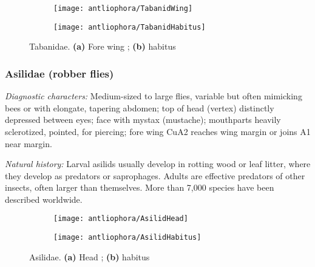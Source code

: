 \begin{figure}[ht!]
    \centering
    \begin{subfigure}[ht!]{0.4\textwidth}
        \texttt{[image: antliophora/TabanidWing]}
        \caption{}
        \label{fig:tabanid1}
    \end{subfigure}
    \qquad
    \begin{subfigure}[ht!]{0.5\textwidth}
        \texttt{[image: antliophora/TabanidHabitus]}
        \caption{}
        \label{fig:tabanid2}
    \end{subfigure}
    \caption{Tabanidae. \textbf{(a)} Fore wing \citep[][Fig. 31.35]{mcalpine1981manual}; \textbf{(b)} habitus \citep[][Fig. 31.1]{mcalpine1981manual}}\label{fig:tabanids}
\end{figure}

\subsubsection{Asilidae (robber flies)}
\noindent{}\textit{Diagnostic characters:} Medium-sized to large flies, variable but often mimicking bees or with elongate, tapering abdomen; top of head (vertex) distinctly depressed between eyes; face with mystax (mustache); mouthparts heavily sclerotized, pointed, for piercing; fore wing CuA2 reaches wing margin or joins A1 near margin.\vspace{3mm}

\noindent{}\textit{Natural history:} Larval asilids usually develop in rotting wood or leaf litter, where they develop as predators or saprophages. Adults are effective predators of other insects, often larger than themselves. More than 7,000 species have been described worldwide.

\begin{figure}[ht!]
    \centering
    \begin{subfigure}[ht!]{0.25\textwidth}
        \texttt{[image: antliophora/AsilidHead]}
        \caption{}
        \label{fig:asilid2}
    \end{subfigure}
    \qquad 
    \begin{subfigure}[ht!]{0.45\textwidth}
        \texttt{[image: antliophora/AsilidHabitus]}
        \caption{}
        \label{fig:asilid1}
    \end{subfigure}
    \caption{Asilidae. \textbf{(a)} Head \citep[][Fig. 42.35]{mcalpine1981manual}; \textbf{(b)} habitus \citep[][Fig. 42.1]{mcalpine1981manual}}\label{fig:asilids}
\end{figure}

